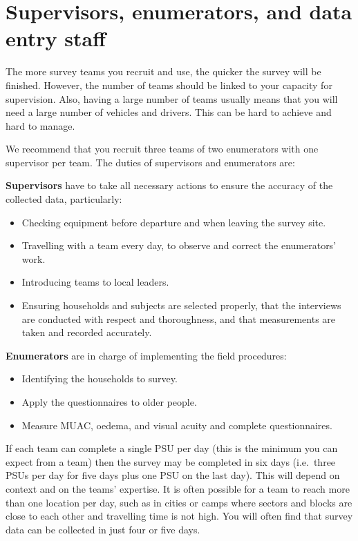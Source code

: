 \documentclass[12pt,a4paper]{book}
\providecommand{\tightlist}{%
  \setlength{\itemsep}{0pt}\setlength{\parskip}{0pt}}
\begin{document}
\hypertarget{supervisors-enumerators-and-data-entry-staff}{%
\section{Supervisors, enumerators, and data entry staff}\label{supervisors-enumerators-and-data-entry-staff}}

The more survey teams you recruit and use, the quicker the survey will be finished. However, the number of teams should be linked to your capacity for supervision. Also, having a large number of teams usually means that you will need a large number of vehicles and drivers. This can be hard to achieve and hard to manage.

We recommend that you recruit three teams of two enumerators with one supervisor per team. The duties of supervisors and enumerators are:

\textbf{Supervisors} have to take all necessary actions to ensure the accuracy of the collected data, particularly:

\begin{itemize}
\tightlist
\item
  Checking equipment before departure and when leaving the survey site.
\item
  Travelling with a team every day, to observe and correct the enumerators' work.
\item
  Introducing teams to local leaders.
\item
  Ensuring households and subjects are selected properly, that the interviews are conducted with respect and thoroughness, and that measurements are taken and recorded accurately.
\end{itemize}

\textbf{Enumerators} are in charge of implementing the field procedures:

\begin{itemize}
\tightlist
\item
  Identifying the households to survey.
\item
  Apply the questionnaires to older people.
\item
  Measure MUAC, oedema, and visual acuity and complete questionnaires.
\end{itemize}

If each team can complete a single PSU per day (this is the minimum you can expect from a team) then the survey may be completed in six days (i.e.~three PSUs per day for five days plus one PSU on the last day). This will depend on context and on the teams' expertise. It is often possible for a team to reach more than one location per day, such as in cities or camps where sectors and blocks are close to each other and travelling time is not high. You will often find that survey data can be collected in just four or five days.
\end{document}
